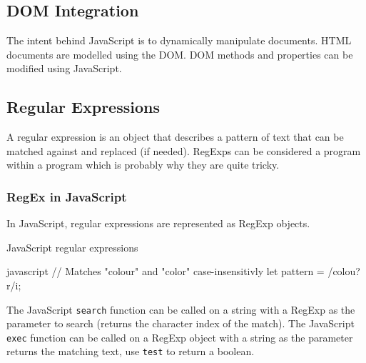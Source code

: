 \subsection{DOM Integration}\label{sub:dom_integration}

The intent behind JavaScript is to dynamically manipulate documents.
HTML documents are modelled using the DOM.
DOM methods and properties can be modified using JavaScript.

\subsection{Regular Expressions}\label{sub:regular_expressions}

A regular expression is an object that describes a pattern of text that can be matched against and replaced (if needed).
RegExps can be considered a program within a program which is probably why they are quite tricky.

\subsubsection{RegEx in JavaScript}\label{ssub:regex_in_javascript}

In JavaScript, regular expressions are represented as RegExp objects.
\begin{highlight}{JavaScript regular expressions}
    \begin{code}{javascript}
        // Matches "colour" and "color" case-insensitivly
        let pattern = /colou?r/i;
    \end{code}
\end{highlight}
The JavaScript \texttt{search} function can be called on a string with a RegExp as the parameter to search (returns the character index of the match).
The JavaScript \texttt{exec} function can be called on a RegExp object with a string as the parameter returns the matching text, use \texttt{test} to return a boolean.
